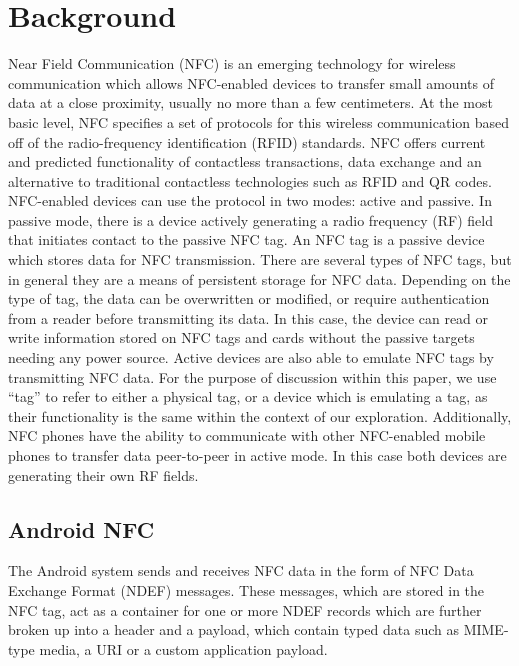 \documentclass[12pt]{article}
\begin{document}
\section{Background}
Near Field Communication (NFC) is an emerging technology for wireless communication which allows NFC-enabled devices to transfer small amounts of data at a close proximity, usually no more than a few centimeters.
At the most basic level, NFC specifies a set of protocols for this wireless communication based off of the radio-frequency identification (RFID) standards.
NFC offers current and predicted functionality of contactless transactions, data exchange and an alternative to traditional contactless technologies such as RFID and QR codes.
NFC-enabled devices can use the protocol in two modes: active and passive.
In passive mode, there is a device actively generating a radio frequency (RF) field that initiates contact to the passive NFC tag.
An NFC tag is a passive device which stores data for NFC transmission.
There are several types of NFC tags, but in general they are a means of persistent storage for NFC data.
Depending on the type of tag, the data can be overwritten or modified, or require authentication from a reader before transmitting its data.
In this case, the device can read or write information stored on NFC tags and cards without the passive targets needing any power source.
Active devices are also able to emulate NFC tags by transmitting NFC data.
For the purpose of discussion within this paper, we use ``tag'' to refer to either a physical tag, or a device which is emulating a tag, as their functionality is the same within the context of our exploration.
Additionally, NFC phones have the ability to communicate with other NFC-enabled mobile phones to transfer data peer-to-peer in active mode.
In this case both devices are generating their own RF fields.

\subsection{Android NFC}

The Android system sends and receives NFC data in the form of NFC Data Exchange Format (NDEF) messages.
These messages, which are stored in the NFC tag, act as a container for one or more NDEF records which are further broken up into a header and a payload, which contain typed data such as MIME-type media, a URI or a custom application payload.
\end{document}

